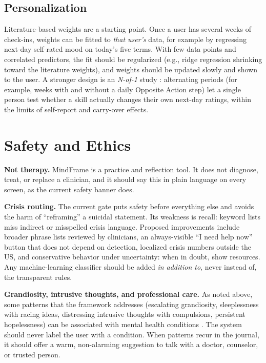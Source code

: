 \documentclass[11pt]{article}
\begin{document}
\subsection{Personalization}\label{sec:personal}
Literature-based weights are a starting point. Once a user has several weeks of check-ins, weights can be fitted to \emph{that user's} data, for example by regressing next-day self-rated mood on today's five terms. With few data points and correlated predictors, the fit should be regularized (e.g., ridge regression shrinking toward the literature weights), and weights should be updated slowly and shown to the user. A stronger design is an \emph{N-of-1} study \citep{kravitz2014}: alternating periods (for example, weeks with and without a daily Opposite Action step) let a single person test whether a skill actually changes their own next-day ratings, within the limits of self-report and carry-over effects.

\section{Safety and Ethics}\label{sec:safety}
\textbf{Not therapy.} MindFrame is a practice and reflection tool. It does not diagnose, treat, or replace a clinician, and it should say this in plain language on every screen, as the current safety banner does.

\textbf{Crisis routing.} The current gate puts safety before everything else and avoids the harm of ``reframing'' a suicidal statement. Its weakness is recall: keyword lists miss indirect or misspelled crisis language. Proposed improvements include broader phrase lists reviewed by clinicians, an always-visible ``I need help now'' button that does not depend on detection, localized crisis numbers outside the US, and conservative behavior under uncertainty: when in doubt, show resources. Any machine-learning classifier should be added \emph{in addition to}, never instead of, the transparent rules.

\textbf{Grandiosity, intrusive thoughts, and professional care.} As noted above, some patterns that the framework addresses (escalating grandiosity, sleeplessness with racing ideas, distressing intrusive thoughts with compulsions, persistent hopelessness) can be associated with mental health conditions \citep{apa2013}. The system should never label the user with a condition. When patterns recur in the journal, it should offer a warm, non-alarming suggestion to talk with a doctor, counselor, or trusted person.
\end{document}
